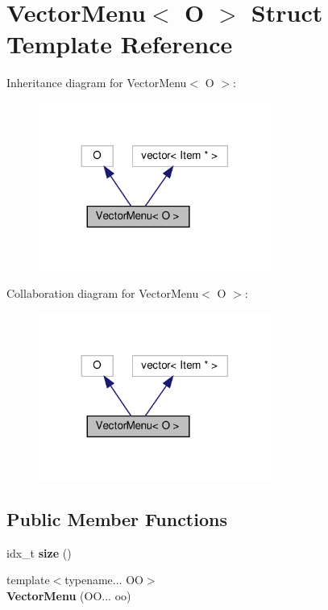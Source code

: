 \hypertarget{structVectorMenu}{}\section{Vector\+Menu$<$ O $>$ Struct Template Reference}
\label{structVectorMenu}


Inheritance diagram for Vector\+Menu$<$ O $>$\+:\nopagebreak
\begin{figure}[H]
\begin{center}
\leavevmode
\includegraphics[width=216pt]{structVectorMenu__inherit__graph}
\end{center}
\end{figure}


Collaboration diagram for Vector\+Menu$<$ O $>$\+:\nopagebreak
\begin{figure}[H]
\begin{center}
\leavevmode
\includegraphics[width=216pt]{structVectorMenu__coll__graph}
\end{center}
\end{figure}
\subsection*{Public Member Functions}
\begin{DoxyCompactItemize}
\item 
\mbox{\label{structVectorMenu_a39baa4124ad558351a972238cbea67e0}} 
idx\+\_\+t {\bfseries size} ()
\item 
\mbox{\label{structVectorMenu_adcbcda0a75dc179a736430cba782eb7c}} 
{\footnotesize template$<$typename... OO$>$ }\\{\bfseries Vector\+Menu} (O\+O... oo)
\end{DoxyCompactItemize}
